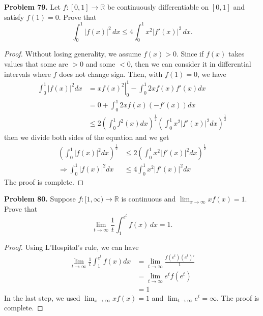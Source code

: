 \documentclass[12pt,leqno]{amsart}
\begin{document}
\noindent
{\bf Problem 79.}
Let $f:[0,1]\to\mathbb{R}$ be continuously differentiable on $[0,1]$ and satisfy $f(1)=0$. Prove that
$$
\int_0^1 |f(x)|^2\, dx\leq 4\int_0^1 x^2|f'(x)|^2\, dx.
$$
\begin{proof}
Without losing generality, we assume $f(x)>0$. Since if $f(x)$ takes values that some are $>0$ and some $<0$, then we can consider it in differential intervals where $f$ does not change sign. Then, with $f(1) = 0$, we have 
\begin{align*}
    \int_0^1 |f(x)|^2 dx & = \left. xf(x)^2 \right|^1_0 - \int^1_0 2x f(x) f'(x) dx \\
    & = 0 + \int^1_0 2x f(x) (-f'(x)) dx \\
    & \leq 2 \left(\int^1_0 f^2(x) dx \right)^{\frac{1}{2}} \left(\int^1_0 x^2 |f'(x)|^2 dx \right)^{\frac{1}{2}}
\end{align*}
then we divide both sides of the equation and we get 
\begin{align*}
    \left(\int_0^1 |f(x)|^2 dx \right)^{\frac{1}{2}} & \leq 2 \left(\int^1_0 x^2 |f'(x)|^2 dx \right)^{\frac{1}{2}}\\
    \Rightarrow \int_0^1 |f(x)|^2 dx & \leq 4 \int^1_0 x^2 |f'(x)|^2 dx
\end{align*}
The proof is complete.
\end{proof}

\medskip

\noindent
{\bf Problem 80.}
Suppose $f:[1,\infty)\to\mathbb{R}$ is continuous and $\lim_{x\to\infty} xf(x)=1$. Prove that
$$
\lim_{t\to\infty}\frac{1}{t}\int_1^{e^t}f(x)\, dx=1.
$$
\begin{proof}
Using L'Hospital's rule, we can have 
\begin{align*}
    \lim_{t\to\infty}\frac{1}{t}\int_1^{e^t}f(x) dx & = \lim_{t\to\infty}\frac{f(e^t)(e^t)'}{1} \\
    & = \lim_{t\to\infty} e^t f(e^t) \\
    & = 1
\end{align*}
In the last step, we used $\lim_{x\to\infty}xf(x)=1$ and $\lim_{t\to\infty}e^t = \infty$. The proof is complete.
\end{proof}

\medskip
\end{document}
